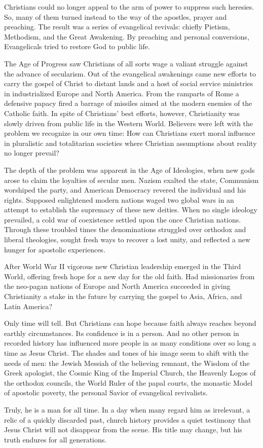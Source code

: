 Christians could no longer appeal to the arm of power to suppress such heresies. So, many of them
turned instead to the way of the apostles, prayer and preaching. The result was a series of
evangelical revivals: chiefly Pietism, Methodism, and the Great Awakening. By preaching and personal
conversions, Evangelicals tried to restore God to public life.

The Age of Progress saw Christians of all sorts wage a valiant struggle against the advance of
secularism. Out of the evangelical awakenings came new efforts to carry the gospel of Christ to
distant lands and a host of social service ministries in industrialized Europe and North America.
From the ramparts of Rome a defensive papacy fired a barrage of missiles aimed at the modern enemies
of the Catholic faith. In spite of Christians’ best efforts, however, Christianity was slowly driven
from public life in the Western World. Believers were left with the problem we recognize in our own
time: How can Christians exert moral influence in pluralistic and totalitarian societies where
Christian assumptions about reality no longer prevail?

The depth of the problem was apparent in the Age of Ideologies, when new gods arose to claim the
loyalties of secular men. Nazism exalted the state, Communism worshiped the party, and American
Democracy revered the individual and his rights. Supposed enlightened modern nations waged two
global wars in an attempt to establish the supremacy of these new deities. When no single ideology
prevailed, a cold war of coexistence settled upon the once Christian nations. Through these troubled
times the denominations struggled over orthodox and liberal theologies, sought fresh ways to recover
a lost unity, and reflected a new hunger for apostolic experiences.

After World War II vigorous new Christian leadership emerged in the Third World, offering fresh hope
for a new day for the old faith. Had missionaries from the neo-pagan nations of Europe and North
America succeeded in giving Christianity a stake in the future by carrying the gospel to Asia,
Africa, and Latin America?

Only time will tell. But Christians can hope because faith always reaches beyond earthly
circumstances. Its confidence is in a person. And no other person in recorded history has influenced
more people in as many conditions over so long a time as Jesus Christ. The shades and tones of his
image seem to shift with the needs of men: the Jewish Messiah of the believing remnant, the Wisdom
of the Greek apologist, the Cosmic King of the Imperial Church, the Heavenly Logos of the orthodox
councils, the World Ruler of the papal courts, the monastic Model of apostolic poverty, the personal
Savior of evangelical revivalists.

Truly, he is a man for all time. In a day when many regard him as irrelevant, a relic of a quickly
discarded past, church history provides a quiet testimony that Jesus Christ will not disappear from
the scene. His title may change, but his truth endures for all generations.
